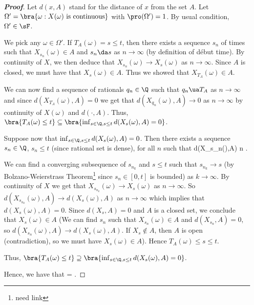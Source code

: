 \begin{proof}[\bf Proof]
Let $d(x,A)$ stand for the distance of $x$ from the set $A$. Let $\Omega' = \bra{\omega:X(\omega)\text{ is continuous}}$ with $\pro(\Omega') = 1$. By usual condition, $\Omega' \in \sF$.

We pick any $\omega \in \Omega'$. If $T_A(\omega) = s \leq t$, then there exists a sequence $s_n$ of times such that $X_{s_n}(\omega) \in A$ and $s_n \da s$ as $n \to \infty$ (by definition of d\'ebut time). By continuity of $X$, we then deduce that $X_{s_n}(\omega) \to X_s(\omega)$ as $n\to \infty$. Since $A$ is closed, we must have that $X_s(\omega) \in A$. Thus we showed that $X_{T_A}(\omega) \in A$.

We can now find a sequence of rationals $q_n \in \Q$ such that $q_n \ua T_A$ as $n \to \infty$ and since $d(X_{T_A}(\omega),A) = 0$ we get that $d(X_{q_n}(\omega),A) \to 0$ as $n \to \infty$ by continuity of $X(\omega)$ and $d(\cdot,A)$. Thus, $\bra{T_A(\omega) \leq t} \subseteq \bra{\inf_{s\in \Q,s\leq t} d(X_s(\omega),A) = 0}$.

Suppose now that $\inf_{s\in \Q,s\leq t} d(X_s(\omega),A) = 0$. Then there exists a sequence $s_n \in \Q$, $s_n \leq t$ (since rational set is dense), for all $n$ such that
\be
d(X_{s_n}(\omega),A)  n \to \infty.
\ee

We can find a converging subsequence of $s_{n_k}$ and $s\leq t$ such that $s_{n_k} \to s$ (by Bolzano-Weierstrass Theorem\footnote{need link} since $s_n \in [0,t]$ is bounded) as $k \to \infty$. By continuity of $X$ we get that $X_{s_{n_k}}(\omega) \to X_s(\omega)$ as $n \to\infty$. So $d(X_{s_{n_k}}(\omega),A) \to d(X_s(\omega),A)$ as $n \to\infty$ which implies that $d(X_s(\omega),A) = 0$. Since $d(X_s,A) = 0$ and $A$ is a closed set, we conclude that $X_s(\omega) \in A$ (We can find $s_n$ such that $X_{s_n}(\omega)\in A$ and $d(X_{s_n},A) = 0$, so $d(X_{s_n}(\omega),A) \to d(X_s(\omega),A)$. If $X_s \notin A$, then $A$ is open (contradiction), so we must have $X_s(\omega)\in A$). Hence $T_A(\omega) \leq s \leq t$.

Thus, $\bra{T_A(\omega) \leq t} \supseteq \bra{\inf_{s\in \Q,s\leq t} d(X_s(\omega),A) = 0}$.

Hence, we have that
\be
{} = .
\ee


\end{proof}
